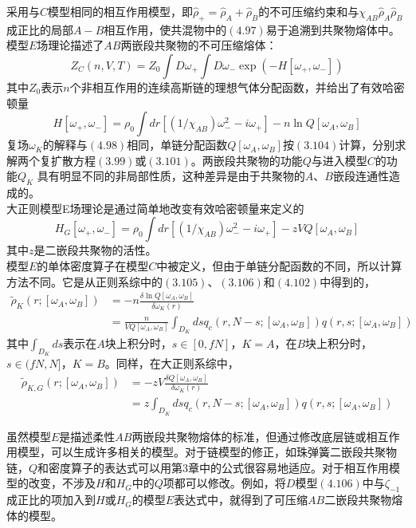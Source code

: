 采用与$C$模型相同的相互作用模型，即$\hat{\rho}_{+}=\hat{\rho}_{A}+\hat{\rho}_{B}$的不可压缩约束和与$\chi_{AB} \hat{\rho}_{A} \hat{\rho}_{B}$成正比的局部$A-B$相互作用，使共混物中的$(4.97)$易于追溯到共聚物熔体中。模型$E$场理论描述了$AB$两嵌段共聚物的不可压缩熔体：\\
\begin{equation}
Z_{C}(n,V,T)=Z_{0} \int D \omega_{+} \int D \omega_{-} \exp (-H[\omega_{+},\omega_{-}])
\end{equation}
其中$Z_0$表示$n$个非相互作用的连续高斯链的理想气体分配函数，并给出了有效哈密顿量\\
\begin{equation}
H[ \omega_{+}, \omega_{-}]= \rho_{0} \int dr [(1/\chi_{AB})\omega_{-}^{2}-i \omega_{+}]-n \ln Q[\omega_{A},\omega_{B}]
\end{equation}
复场$\omega_{K}$的解释与$(4.98)$相同，单链分配函数$Q[\omega_{A},\omega_{B}]$按$(3.104)$计算，分别求解两个复扩散方程$(3.99)$或$(3.101)$。两嵌段共聚物的功能$Q$与进入模型$C$的功能$Q_{K}$ 具有明显不同的非局部性质，这种差异是由于共聚物的$A$、$B$嵌段连通性造成的。\\

大正则模型E场理论是通过简单地改变有效哈密顿量来定义的\\
\begin{equation}
H_{G}[ \omega_{+}, \omega_{-}]= \rho_{0} \int dr [(1/\chi_{AB})\omega_{-}^{2}-i \omega_{+}]- z  V Q[\omega_{A},\omega_{B}]
\end{equation}
其中$z$是二嵌段共聚物的活性。\\

模型$E$的单体密度算子在模型$C$中被定义，但由于单链分配函数的不同，所以计算方法不同。它是从正则系综中的$(3.105)$、$(3.106)$和$(4.102)$中得到的，\\
\begin{equation}
\begin{aligned}
\tilde{\rho}_{K}(r;[\omega_{A},\omega_{B}]) &=-n \frac{\delta \ln Q[\omega_{A},\omega_{B}]}{\delta \omega_{K}(r)} \\&= \frac{n}{V Q[\omega_{A},\omega_{B}]} \int_{D_{K}} ds q_{c}(r,N-s;[\omega_{A},\omega_{B}])q(r,s;[\omega_{A},\omega_{B}])
\end{aligned}
\end{equation}
其中$\int_{D_{K}} ds$表示在$A$块上积分时，$s\in[0,fN]$，$K=A$，在$B$块上积分时，$s\in(fN,N]$，$K=B$。同样，在大正则系综中，\\
\begin{equation}
\begin{aligned}
\tilde{\rho}_{K,G}(r;[\omega_{A},\omega_{B}])&=-z V \frac{\delta Q[\omega_{A},\omega_{B}]}{\delta \omega_{K}(r)} \\&= z \int_{D_{K}} d s q_{c}(r,N-s;[\omega_{A},\omega_{B}])q(r,s;[\omega_{A},\omega_{B}])
\end{aligned}
\end{equation}

虽然模型$E$是描述柔性$AB$两嵌段共聚物熔体的标准，但通过修改底层链或相互作用模型，可以生成许多相关的模型。对于链模型的修正，如珠弹簧二嵌段共聚物链，$Q$和密度算子的表达式可以用第3章中的公式很容易地适应。对于相互作用模型的改变，不涉及$H$和$H_{G}$中的$Q$项都可以修改。例如，将$D$模型$(4.106)$中与$\zeta_{-1}$成正比的项加入到$H$或$H_{G}$的模型$E$表达式中，就得到了可压缩$AB$二嵌段共聚物熔体的模型。

